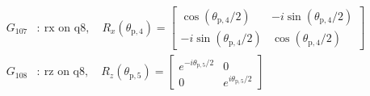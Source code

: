 \begin{align*}
G_{107}&:\ \text{rx on q8},\quad R_x(\theta_{\mathrm{p},4})=\begin{bmatrix}\cos(\theta_{\mathrm{p},4}/2)&-i\sin(\theta_{\mathrm{p},4}/2)\\-i\sin(\theta_{\mathrm{p},4}/2)&\cos(\theta_{\mathrm{p},4}/2)\end{bmatrix}\\
G_{108}&:\ \text{rz on q8},\quad R_z(\theta_{\mathrm{p},5})=\begin{bmatrix}e^{-i\theta_{\mathrm{p},5}/2}&0\\0&e^{i\theta_{\mathrm{p},5}/2}\end{bmatrix}\\
\end{align*}
